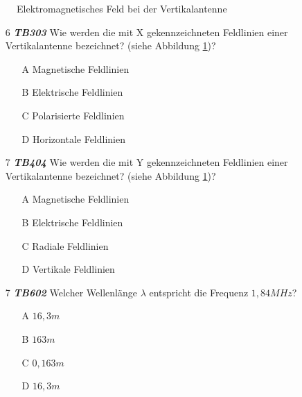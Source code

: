 \begin{figure}[H]
\centering

\caption{Elektromagnetisches Feld bei der Vertikalantenne}
\label{AntSchwingkreis_02}
\end{figure}

\begin{enumerate} 
\itemsep1pt\parskip0pt
\item[6] \emph{\textbf{TB303}} Wie werden die mit X gekennzeichneten Feldlinien einer Vertikalantenne bezeichnet? (siehe Abbildung \ref{AntSchwingkreis_02})?
	\begin{enumerate}
	\itemsep1pt\parskip0pt
		\item[A] Magnetische Feldlinien
		\item[B] Elektrische Feldlinien
		\item[C] Polarisierte Feldlinien
		\item[D] Horizontale Feldlinien
	\end{enumerate}
\end{enumerate}


\begin{enumerate} 
\itemsep1pt\parskip0pt
\item[7] \emph{\textbf{TB404}} Wie werden die mit Y gekennzeichneten Feldlinien einer Vertikalantenne bezeichnet? (siehe Abbildung \ref{AntSchwingkreis_02})?
	\begin{enumerate}
	\itemsep1pt\parskip0pt
		\item[A] Magnetische Feldlinien
		\item[B] Elektrische Feldlinien
		\item[C] Radiale Feldlinien
		\item[D] Vertikale Feldlinien
	\end{enumerate}
\end{enumerate}

\begin{enumerate} 
\itemsep1pt\parskip0pt
\item[7] \emph{\textbf{TB602}} Welcher Wellenlänge $\lambda$ entspricht die Frequenz $1,84 MHz$?
	\begin{enumerate}
	\itemsep1pt\parskip0pt
		\item[A] $16,3m$
		\item[B] $163m$
		\item[C] $0,163m$
		\item[D] $16,3m$
	\end{enumerate}
\end{enumerate}